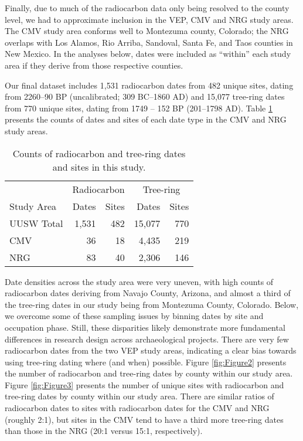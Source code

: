\documentclass[
]{sa}
\begin{document}
Finally, due to much of the radiocarbon data only being resolved to the county level, we had to approximate inclusion in the VEP, CMV and NRG study areas. The CMV study area conforms well to Montezuma county, Colorado; the NRG overlaps with Los Alamos, Rio Arriba, Sandoval, Santa Fe, and Taos counties in New Mexico. In the analyses below, dates were included as ``within'' each study area if they derive from those respective counties.

Our final dataset includes 1,531 radiocarbon dates from 482 unique sites, dating from 2260--90 BP (uncalibrated; 309 BC--1860 AD) and 15,077 tree-ring dates from 770 unique sites, dating from 1749 -- 152 BP (201--1798 AD). Table \ref{tab:Table1} presents the counts of dates and sites of each date type in the CMV and NRG study areas.

\begin{table}

\caption{\label{tab:Table1}Counts of radiocarbon and tree-ring dates and sites in this study.}
\centering
\begin{tabular}[t]{lrrrr}
\toprule
\multicolumn{1}{c}{ } & \multicolumn{2}{c}{Radiocarbon} & \multicolumn{2}{c}{Tree-ring} \\
\cmidrule(l{3pt}r{3pt}){2-3} \cmidrule(l{3pt}r{3pt}){4-5}
Study Area & Dates & Sites & Dates & Sites\\
\midrule
UUSW Total & 1,531 & 482 & 15,077 & 770\\
CMV & 36 & 18 & 4,435 & 219\\
NRG & 83 & 40 & 2,306 & 146\\
\bottomrule
\end{tabular}
\end{table}

Date densities across the study area were very uneven, with high counts of radiocarbon dates deriving from Navajo County, Arizona, and almost a third of the tree-ring dates in our study being from Montezuma County, Colorado. Below, we overcome some of these sampling issues by binning dates by site and occupation phase. Still, these disparities likely demonstrate more fundamental differences in research design across archaeological projects. There are very few radiocarbon dates from the two VEP study areas, indicating a clear bias towards using tree-ring dating where (and when) possible. Figure \ref{fig:Figure2} presents the number of radiocarbon and tree-ring dates by county within our study area. Figure \ref{fig:Figure3} presents the number of unique sites with radiocarbon and tree-ring dates by county within our study area. There are similar ratios of radiocarbon dates to sites with radiocarbon dates for the CMV and NRG (roughly 2:1), but sites in the CMV tend to have a third more tree-ring dates than those in the NRG (20:1 versus 15:1, respectively).
\end{document}
